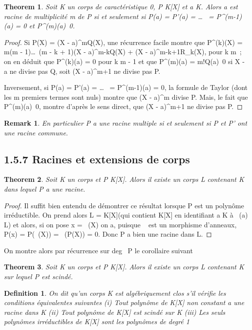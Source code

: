 \documentclass{article}
\newtheorem{theorem}{Theorem}[section]
\newenvironment{thm}
  {\begin{theorem}}
  {\end{theorem}}
\newtheorem{definition}{Definition}[section]
\newenvironment{de}
  {\begin{definition}}
  {\end{definition}}
\newtheorem{remark}{Remark}[section]
\newenvironment{rem}
  {\begin{remark}}
  {\end{remark}}
\begin{document}
\begin{thm}
Soit K un corps de caractéristique 0, P \in K[X] et
a \in K. Alors a est racine de multiplicité m de P si et seulement si P(a)
= P'(a) = \ldots~ =
P^(m-1)(a) = 0 et
P^(m)(a)\neq~0.
\end{thm}

\begin{proof}
Si P(X) = (X - a)^mQ(X), une récurrence facile
montre que P^(k)(X) = m(m -
1)\ldots~(m - k +
1)(X - a)^m-kQ(X) + (X - a)^m-k+1R_k(X),
pour k \leq m~; on en déduit que P^(k)(a) = 0 pour k \leq m - 1 et
que P^(m)(a) = m!Q(a)\neq~0 si X - a
ne divise pas Q, soit (X - a)^m+1 ne divise pas P.

Inversement, si P(a) = P'(a) =
\ldots~ =
P^(m-1)(a) = 0, la formule de Taylor (dont les m premiers
termes sont nuls) montre que (X - a)^m divise P. Mais, le
fait que P^(m)(a)\neq~0, montre
d'après le sens direct, que (X - a)^m+1 ne divise pas P.
\end{proof}

\begin{rem}
En particulier P a une racine multiple si et seulement si
P et P' ont une racine commune.
\end{rem}

\subsection{1.5.7 Racines et extensions de corps}

\begin{thm}
Soit K un corps et P \in K[X]. Alors il existe un
corps L contenant K dans lequel P a une racine.
\end{thm}

\begin{proof}
Il suffit bien entendu de démontrer ce résultat lorsque P
est un polynôme irréductible. On prend alors L = K[X]\diagupPK[X] (qui
contient K[X] en identifiant a \in K à \pi~(a) \in L) et alors, si on pose
x = \pi~(X) on a, puisque \pi~ est un morphisme d'anneaux, P(x) = P(\pi~(X)) =
\pi~(P(X)) = 0. Donc P a bien une racine dans L.
\end{proof}

On montre alors par récurrence sur deg~ P le
corollaire suivant

\begin{thm}
Soit K un corps et P \in K[X]. Alors il existe un
corps L contenant K sur lequel P est scindé.
\end{thm}

\begin{de}
On dit qu'un corps K est algébriquement clos s'il
vérifie les conditions équivalentes suivantes (i) Tout polynôme de
K[X] non constant a une racine dans K (ii) Tout polynôme de K[X]
est scindé sur K (iii) Les seuls polynômes irréductibles de K[X]
sont les polynômes de degré 1
\end{de}
\end{document}

